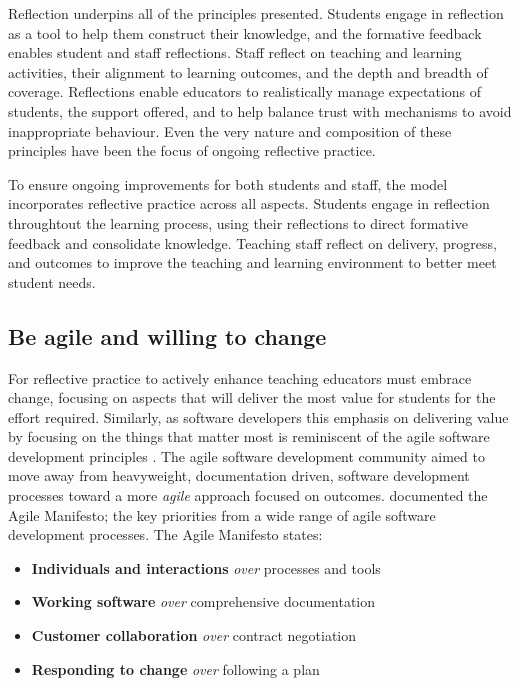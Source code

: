 Reflection underpins all of the principles presented. Students engage in reflection as a tool to help them construct their knowledge, and the formative feedback enables student and staff reflections. Staff reflect on teaching and learning activities, their alignment to learning outcomes, and the depth and breadth of coverage. Reflections enable educators to realistically manage expectations of students, the support offered, and to help balance trust with mechanisms to avoid inappropriate behaviour. Even the very nature and composition of these principles have been the focus of ongoing reflective practice.

To ensure ongoing improvements for both students and staff, the model incorporates reflective practice across all aspects. Students engage in reflection throughtout the learning process, using their reflections to direct formative feedback and consolidate knowledge. Teaching staff reflect on delivery, progress, and outcomes to improve the teaching and learning environment to better meet student needs.



\subsection{Be agile and willing to change} %
\label{ssub:be_agile_and_willing_to_change}

For reflective practice to actively enhance teaching educators must embrace change, focusing on aspects that will deliver the most value for students for the effort required. Similarly, as software developers this emphasis on delivering value by focusing on the things that matter most is reminiscent of the agile software development principles \cite{Martin:2003}. The agile software development community aimed to move away from heavyweight, documentation driven, software development processes toward a more \emph{agile} approach focused on outcomes. \citet{Beck:2001} documented the Agile Manifesto; the key priorities from a wide range of agile software development processes. The Agile Manifesto states: 

\begin{itemize}[noitemsep,nolistsep]
	\item \textbf{Individuals and interactions} \emph{over} processes and tools
	\item \textbf{Working software} \emph{over} comprehensive documentation
	\item \textbf{Customer collaboration} \emph{over} contract negotiation
	\item \textbf{Responding to change} \emph{over} following a plan
\end{itemize}

